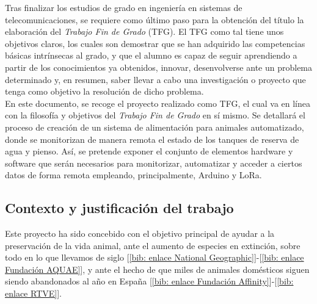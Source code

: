\documentclass[12pt]{article}
\begin{document}
	Tras finalizar los estudios de grado en ingeniería en sistemas de telecomunicaciones, se requiere como último paso para la obtención del título la elaboración del \textit{Trabajo Fin de Grado} (TFG). 
	El TFG como tal tiene unos objetivos claros, los cuales son demostrar que se han adquirido las competencias básicas intrínsecas al grado, y que el alumno es capaz de seguir aprendiendo a partir de los conocimientos ya obtenidos, innovar, desenvolverse ante un problema determinado y, en resumen, saber llevar a cabo una investigación o proyecto que tenga como objetivo la resolución de dicho problema. \\
	
	\noindent En este documento, se recoge el proyecto realizado como TFG,  el cual va en línea con la filosofía y objetivos del \textit{Trabajo Fin de Grado} en sí mismo. Se detallará el proceso de creación de un sistema de alimentación para animales automatizado, donde se monitorizan de manera remota el estado de los tanques de reserva de agua y pienso. Así, se pretende exponer el conjunto de elementos hardware y software que serán necesarios para monitorizar, automatizar y acceder a ciertos datos de forma remota empleando, principalmente, Arduino y LoRa.\\
	
	
	\subsection[Contexto y justificación del trabajo]{Contexto y justificación del trabajo}
	\label{subsection: contexto y justificacion}
	
	\noindent Este proyecto ha sido concebido con el objetivo principal de ayudar a la preservación de la vida animal, ante el aumento de especies en extinción, sobre todo en lo que llevamos de siglo [\ref{bib: enlace National Geographic}]-[\ref{bib: enlace Fundación AQUAE}], 
	y ante el hecho de que miles de animales domésticos siguen siendo abandonados al año en España [\ref{bib: enlace Fundación Affinity}]-[\ref{bib: enlace RTVE}]. \\ %
	
\end{document}
